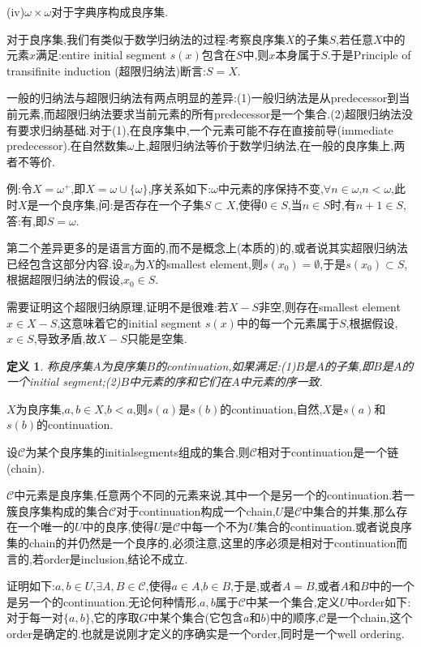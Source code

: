 \documentclass[12pt,a4paper,openany]{book}
\newtheorem{definition}{定义}[section]
\begin{document}
(iv)$\omega \times \omega$对于字典序构成良序集.

对于良序集,我们有类似于数学归纳法的过程:考察良序集$X$的子集$S$,若任意$X$中的元素$x$满足:entire initial segment $s(x)$包含在$S$中,则$x$本身属于$S$.于是Principle of transifinite induction (超限归纳法)断言:$S=X$.

一般的归纳法与超限归纳法有两点明显的差异:(1)一般归纳法是从predecessor到当前元素,而超限归纳法要求当前元素的所有predecessor是一个集合.(2)超限归纳法没有要求归纳基础.对于(1),在良序集中,一个元素可能不存在直接前导(immediate predecessor).在自然数集$\omega$上,超限归纳法等价于数学归纳法,在一般的良序集上,两者不等价.

例:令$X = \omega^+$,即$X=\omega \cup \{\omega\}$,序关系如下:$\omega$中元素的序保持不变,$\forall n \in \omega$,$n < \omega$,此时$X$是一个良序集,问:是否存在一个子集$S \subset X$,使得$0 \in S$,当$n \in S$时,有$n+1 \in S$,答:有,即$S=\omega$.

第二个差异更多的是语言方面的,而不是概念上(本质的)的,或者说其实超限归纳法已经包含这部分内容.设$x_0$为$X$的smallest element,则$s(x_0)=\emptyset$,于是$s(x_0) \subset S$,根据超限归纳法的假设,$x_0 \in S$.

需要证明这个超限归纳原理,证明不是很难:若$X-S$非空,则存在smallest element $x \in X-S$,这意味着它的initial segment $s(x)$中的每一个元素属于$S$,根据假设,$x \in S$,导致矛盾,故$X-S$只能是空集.

\begin{definition}
称良序集$A$为良序集$B$的continuation,如果满足:(1)$B$是$A$的子集,即$B$是$A$的一个initial segment;(2)$B$中元素的序和它们在$A$中元素的序一致.
\end{definition}

$X$为良序集,$a,b \in X$,$b<a$,则$s(a)$是$s(b)$的continuation,自然,$X$是$s(a)$和$s(b)$的continuation.

设$\mathscr{C}$为某个良序集的initialsegments组成的集合,则$\mathscr{C}$相对于continuation是一个链(chain).

$\mathscr{C}$中元素是良序集,任意两个不同的元素来说,其中一个是另一个的continuation.若一簇良序集构成的集合$\mathscr{C}$对于continuation构成一个chain,$U$是$\mathscr{C}$中集合的并集,那么存在一个唯一的$U$中的良序,使得$U$是$\mathscr{C}$中每一个不为$U$集合的continuation.或者说良序集的chain的并仍然是一个良序的,必须注意,这里的序必须是相对于continuation而言的,若order是inclusion,结论不成立.

证明如下:$a,b \in U$,$\exists A, B \in \mathscr{C}$,使得$a \in A$,$b \in B$,于是,或者$A=B$,或者$A$和$B$中的一个是另一个的continuation.无论何种情形,$a,b$属于$\mathscr{C}$中某一个集合,定义$U$中order如下:对于每一对$\{a,b\}$,它的序取$G$中某个集合(它包含$a$和$b$)中的顺序,$\mathscr{C}$是一个chain,这个order是确定的.也就是说刚才定义的序确实是一个order,同时是一个well ordering.
\end{document}
